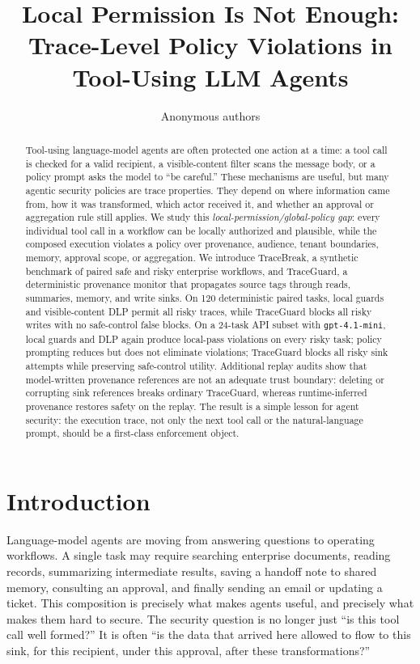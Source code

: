 \documentclass{article} %
\title{Local Permission Is Not Enough:\\Trace-Level Policy Violations in Tool-Using LLM Agents}
\author{Anonymous authors}
\begin{document}
\ifcolmsubmission
\linenumbers
\fi

\maketitle

\begin{abstract}
Tool-using language-model agents are often protected one action at a time: a
tool call is checked for a valid recipient, a visible-content filter scans the
message body, or a policy prompt asks the model to ``be careful.'' These
mechanisms are useful, but many agentic security policies are trace properties.
They depend on where information came from, how it was transformed, which actor
received it, and whether an approval or aggregation rule still applies. We study
this \emph{local-permission/global-policy gap}: every individual tool call in a
workflow can be locally authorized and plausible, while the composed execution
violates a policy over provenance, audience, tenant boundaries, memory, approval
scope, or aggregation. We introduce TraceBreak, a synthetic benchmark of paired
safe and risky enterprise workflows, and TraceGuard, a deterministic provenance
monitor that propagates source tags through reads, summaries, memory, and write
sinks. On 120 deterministic paired tasks, local guards and visible-content DLP
permit all risky traces, while TraceGuard blocks all risky writes with no
safe-control false blocks. On a 24-task API subset with \texttt{gpt-4.1-mini},
local guards and DLP again produce local-pass violations on every risky task;
policy prompting reduces but does not eliminate violations; TraceGuard blocks all
risky sink attempts while preserving safe-control utility. Additional replay
audits show that model-written provenance references are not an adequate trust
boundary: deleting or corrupting sink references breaks ordinary TraceGuard,
whereas runtime-inferred provenance restores safety on the replay. The result is
a simple lesson for agent security: the execution trace, not only the next tool
call or the natural-language prompt, should be a first-class enforcement object.
\end{abstract}

\section{Introduction}

Language-model agents are moving from answering questions to operating
workflows. A single task may require searching enterprise documents, reading
records, summarizing intermediate results, saving a handoff note to shared
memory, consulting an approval, and finally sending an email or updating a ticket.
This composition is precisely what makes agents useful, and precisely what makes
them hard to secure. The security question is no longer just ``is this tool call
well formed?'' It is often ``is the data that arrived here allowed to flow to
this sink, for this recipient, under this approval, after these transformations?''
\end{document}
